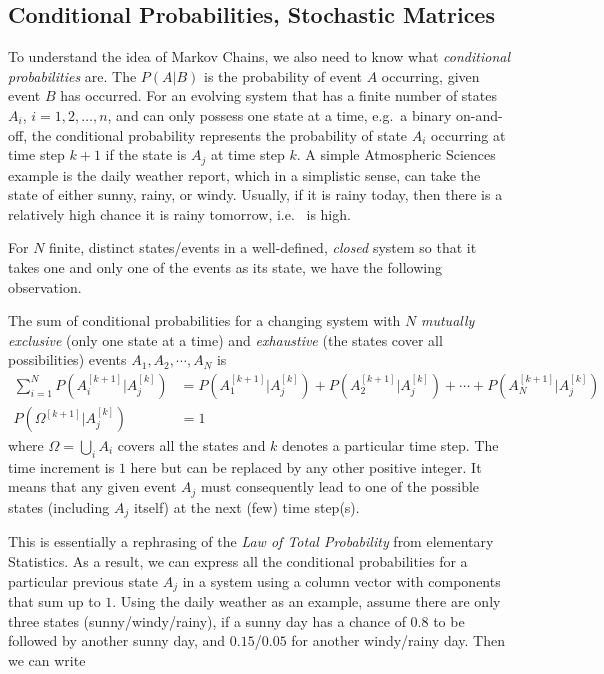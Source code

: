 \subsection{Conditional Probabilities, Stochastic Matrices}
To understand the idea of Markov Chains, we also need to know what \textit{conditional probabilities} are. The  $P(A|B)$ is the probability of event $A$ occurring, given event $B$ has occurred. For an evolving system that has a finite number of states $A_i$, $i = 1,2,\ldots,n$, and can only possess one state at a time, e.g.\ a binary on-and-off, the conditional probability  represents the probability of state $A_i$ occurring at time step $k+1$ if the state is $A_j$ at time step $k$. A simple Atmospheric Sciences example is the daily weather report, which in a simplistic sense, can take the state of either sunny, rainy, or windy. Usually, if it is rainy today, then there is a relatively high chance it is rainy tomorrow, i.e.\  is high. \par
For $N$ finite, distinct states/events in a well-defined, \textit{closed} system so that it takes one and only one of the events as its state, we have the following observation.
\begin{proper}
\label{proper:condprobsumto1}
The sum of conditional probabilities for a changing system with $N$ \textit{mutually exclusive} (only one state at a time) and \textit{exhaustive} (the states cover all possibilities) events $A_1, A_2, \cdots, A_N$ is
\begin{align}
\sum_{i=1}^N P(A_i^{[k+1]}|A_j^{[k]}) &= P(A_1^{[k+1]}|A_j^{[k]}) + P(A_2^{[k+1]}|A_j^{[k]}) + \cdots + P(A_N^{[k+1]}|A_j^{[k]}) \nonumber \\
P(\Omega^{[k+1]}|A_j^{[k]}) &= 1
\end{align}
where $\Omega = \bigcup_{i} A_i$ covers all the states and $k$ denotes a particular time step. The time increment is $1$ here but can be replaced by any other positive integer. It means that any given event $A_j$ must consequently lead to one of the possible states (including $A_j$ itself) at the next (few) time step(s).
\end{proper}
This is essentially a rephrasing of the \textit{Law of Total Probability} from elementary Statistics. As a result, we can express all the conditional probabilities  for a particular previous state $A_j$ in a system using a column vector with components that sum up to $1$. Using the daily weather as an example, assume there are only three states (sunny/windy/rainy), if a sunny day has a chance of $0.8$ to be followed by another sunny day, and $0.15$/$0.05$ for another windy/rainy day. Then we can write
